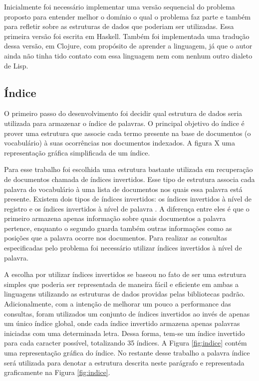 Inicialmente foi necessário implementar uma versão sequencial do problema proposto para entender melhor o domínio o qual o problema faz parte e também para refletir sobre as estruturas de dados que poderiam ser utilizadas. Essa primeira versão foi escrita em Haskell. Também foi implementada uma tradução dessa versão, em Clojure, com propósito de aprender a linguagem, já que o autor ainda não tinha tido contato com essa linguagem nem com nenhum outro dialeto de Lisp.

\subsection{Índice}

O primeiro passo do desenvolvimento foi decidir qual estrutura de dados seria utilizada para armazenar o índice de palavras. O principal objetivo do índice é prover uma estrutura que associe cada termo presente na base de documentos (o vocabulário) à suas ocorrências nos documentos indexados. A figura X uma representação gráfica simplificada de um índice.

Para esse trabalho foi escolhida uma estrutura bastante utilizada em recuperação de documentos chamada de índices invertidos. Esse tipo de estrutura associa cada palavra  do vocabulário à uma lista de documentos nos quais essa palavra está presente. Existem dois tipos de índices invertidos: os índices invertidos à nível de registro e os índices invertidos à nível de palavra \cite{baeza1999modern}. A diferença entre eles é que o primeiro armazena apenas informação sobre quais documentos a palavra pertence, enquanto o segundo guarda também outras informações como as posições que a palavra ocorre nos documentos. Para realizar as consultas especificadas pelo problema foi necessário utilizar índices invertidos à nível de palavra.

A escolha por utilizar índices invertidos se baseou no fato de ser uma estrutura simples que poderia ser representada de maneira fácil e eficiente em ambas a linguagens utilizando as estruturas de dados providas pelas bibliotecas padrão. Adicionalmente, com a intenção de melhorar um pouco a performance das consultas, foram utilizados um conjunto de índices invertidos ao invés de apenas um único índice global, onde cada índice invertido armazena apenas palavras iniciadas com uma determinada letra. Dessa forma, tem-se um índice invertido para cada caracter possível, totalizando 35 índices. A Figura \ref{fig:indice} contém uma representação gráfica do índice. No restante desse trabalho a palavra índice será utilizada para denotar a estrutura descrita neste parágrafo e representada graficamente na Figura \ref{fig:indice}.

